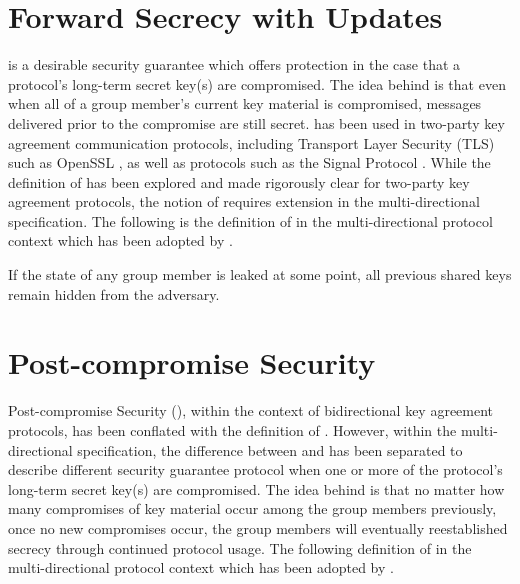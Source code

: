 \hypertarget{sec:forward-secrecy-with-updates}{%
\section{Forward Secrecy with Updates}\label{sec:forward-secrecy-with-updates}}

 is a desirable security guarantee which offers protection in the case that a protocol's long-term secret key(s) are compromised.
The idea behind  is that even when all of a group member's current key material is compromised, messages delivered prior to the compromise are still secret.
 has been used in two-party key agreement communication protocols, including Transport Layer Security (TLS) \autocite{rfc2246, rfc4346, rfc5246, rfc8446} such as OpenSSL \autocite{openssl}, as well as  protocols such as the Signal Protocol \autocite{cohn2020formal}.
While the definition of  has been explored and made rigorously clear for two-party key agreement protocols, the notion of  requires extension in the multi-directional  specification.
The following is the definition of  in the multi-directional protocol context \autocite{alwen2020security} which has been adopted by .

\begin{definition}
If the state of any group member is leaked at some point, all previous shared keys remain hidden from the adversary.
\end{definition}


\hypertarget{sec:post-compromise-security}{%
\section{Post-compromise Security}\label{sec:post-compromise-security}}

Post-compromise Security (), within the context of bidirectional key agreement protocols, has been conflated with the definition of .
However, within the multi-directional  specification, the difference between  and  has been separated to describe different security guarantee protocol when one or more of the protocol's long-term secret key(s) are compromised.
The idea behind  is that no matter how many compromises of key material occur among the group members previously, once no new compromises occur, the group members will eventually reestablished secrecy through continued protocol usage.
The following definition of  in the multi-directional protocol context \autocite{alwen2020security} which has been adopted by .

